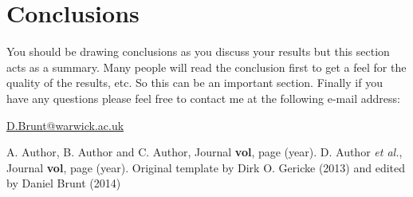 \documentclass[a4paper, onecolumn, 12pt, notitlepage]{revtex4-1}
\begin{document}
\section{Conclusions}
You should be drawing conclusions as you discuss your results but this section acts as a summary. Many people will read the conclusion first to get a feel for the quality of the results, etc. So this can be an important section. Finally if you have any questions please feel free to contact me at the following e-mail address:

\begin{center}
\url{D.Brunt@warwick.ac.uk}
\end{center}


\begin{thebibliography}{99}

\setlength{\itemsep}{-2mm}

 A. Author, B. Author and C. Author,
                  Journal {\bf vol}, page (year).
 D. Author {\em et al.},
                  Journal {\bf vol}, page (year).
 Original template by Dirk O. Gericke (2013) and edited by Daniel Brunt (2014) 
\end{thebibliography}
\end{document}
